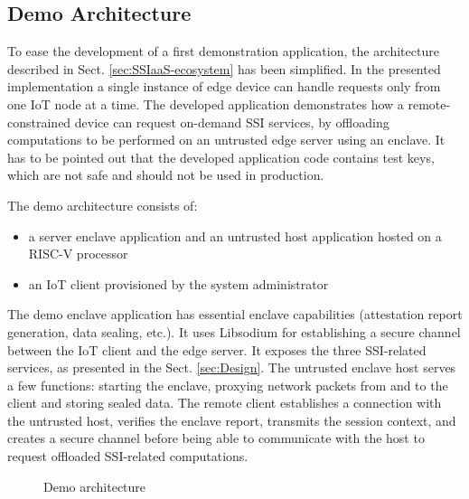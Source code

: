 \subsection{Demo Architecture}
To ease the development of a first demonstration application, the architecture described in Sect. \ref{sec:SSIaaS-ecosystem} has been simplified. In the presented implementation a single instance of edge device can handle requests only from one IoT node at a time. The developed application demonstrates how a remote-constrained device can request on-demand SSI services, by offloading computations to be performed on an untrusted edge server using an enclave. It has to be pointed out that the developed application code contains test keys, which are not safe and should not be used in production. 

The demo architecture consists of:
\begin{itemize}
    \item a server enclave application and an untrusted host application hosted on a RISC-V processor
    \item an IoT client provisioned by the system administrator  
\end{itemize} 

The demo enclave application has essential enclave capabilities (attestation report generation, data sealing, etc.). It uses Libsodium \cite{libsodium} for establishing a secure channel between the IoT client and the edge server. It exposes the three SSI-related services, as presented in the Sect. \ref{sec:Design}. The untrusted enclave host serves a few functions: starting the enclave, proxying network packets from and to the client and storing sealed data. The remote client establishes a connection with the untrusted host, verifies the enclave report, transmits the session context, and creates a secure channel before being able to communicate with the host to request offloaded SSI-related computations. 

\begin{figure}[!h]
    \centering
    
    \caption{Demo architecture}
    \label{poc-architecture}
\end{figure}

